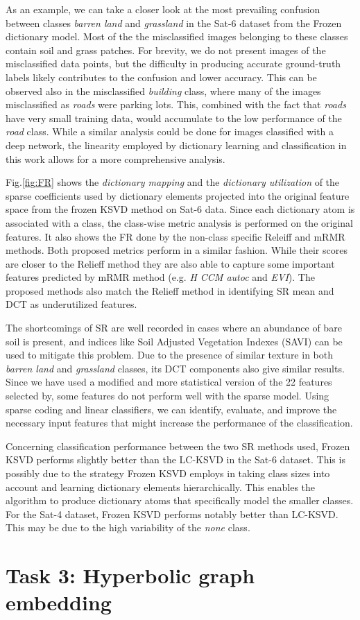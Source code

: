 As an example, we can take a closer look at the most prevailing confusion between classes \emph{barren land} and \emph{grassland} in the Sat-6 dataset from the Frozen dictionary model. Most of the the misclassified images belonging to these classes contain soil and grass patches. For brevity, we do not present images of the misclassified data points, but the difficulty in producing accurate ground-truth labels likely contributes to the confusion and lower accuracy. This can be observed also in the misclassified \emph{building} class, where many of the images misclassified as \emph{roads} were parking lots. This, combined with the fact that \emph{roads} have very small training data, would accumulate to the low performance of the \emph{road} class. While a similar analysis could be done for images classified with a deep network, the linearity employed by dictionary learning and classification in this work allows for a more comprehensive analysis. 

Fig.\ref{fig:FR} shows the \emph{dictionary mapping} and the \emph{dictionary utilization} of the sparse coefficients used by dictionary elements projected into the original feature space from the frozen KSVD method on Sat-6 data. Since each dictionary atom is associated with a class, the class-wise metric analysis is performed on the original features. It also shows the FR done by the non-class specific Releiff and mRMR methods. Both proposed metrics perform in a similar fashion. While their scores are closer to the Relieff method they are also able to capture some important features predicted by mRMR method (e.g. \emph{H CCM autoc} and \emph{EVI}). The proposed methods also match the Relieff method in identifying SR mean and DCT as underutilized features.

The shortcomings of SR are well recorded in cases where an abundance of bare soil is present, and indices like Soil Adjusted Vegetation Indexes (SAVI) can be used to mitigate this problem\cite{Huete1988}. Due to the presence of similar texture in both \emph{barren land} and \emph{grassland} classes, its DCT components also give similar results. Since we have used a modified and more statistical version of the 22 features selected by\cite{Basu2015}, some features do not perform well with the sparse model. Using sparse coding and linear classifiers, we can identify, evaluate, and improve the necessary input features that might increase the performance of the classification.

Concerning classification performance between the two SR methods used, Frozen KSVD performs slightly better than the LC-KSVD in the Sat-6 dataset. This is possibly due to the strategy Frozen KSVD employs in taking class sizes into account and learning dictionary elements hierarchically. This enables the algorithm to produce dictionary atoms that specifically model the smaller classes. For the Sat-4 dataset, Frozen KSVD performs notably better than LC-KSVD\@. This may be due to the high variability of the \emph{none} class.

\section{Task 3: Hyperbolic graph embedding}